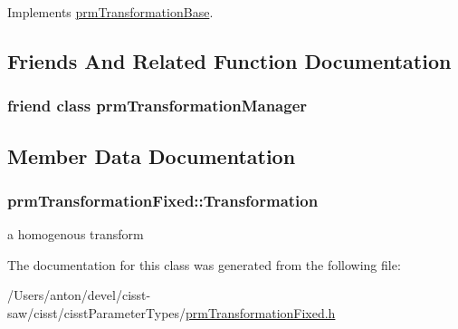Implements \hyperlink{classprm_transformation_base_a64df0853559412fe0c48fc610ad2f6bf}{prm\+Transformation\+Base}.



\subsection{Friends And Related Function Documentation}
\hypertarget{classprm_transformation_fixed_af7fc0618e84bdf8b1d22bc2635f29eea}{}
\subsubsection[{prm\+Transformation\+Manager}]{\setlength{\rightskip}{0pt plus 5cm}friend class {\bf prm\+Transformation\+Manager}\hspace{0.3cm}{\ttfamily [friend]}}\label{classprm_transformation_fixed_af7fc0618e84bdf8b1d22bc2635f29eea}


\subsection{Member Data Documentation}
\hypertarget{classprm_transformation_fixed_a3b213d736a137afc62afc53ca79597b1}{}
\subsubsection[{Transformation}]{ prm\+Transformation\+Fixed\+::\+Transformation\hspace{0.3cm}{\ttfamily [protected]}}\label{classprm_transformation_fixed_a3b213d736a137afc62afc53ca79597b1}
a homogenous transform 

The documentation for this class was generated from the following file\+:\begin{DoxyCompactItemize}
\item 
/\+Users/anton/devel/cisst-\/saw/cisst/cisst\+Parameter\+Types/\hyperlink{prm_transformation_fixed_8h}{prm\+Transformation\+Fixed.\+h}\end{DoxyCompactItemize}
